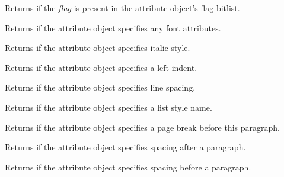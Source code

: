 Returns \true if the {\it flag} is present in the attribute object's flag bitlist.

\label{wxrichtextattrhasfont}


Returns \true if the attribute object specifies any font attributes.

\label{wxrichtextattrhasitalic}


Returns \true if the attribute object specifies italic style.

\label{wxrichtextattrhasleftindent}


Returns \true if the attribute object specifies a left indent.

\label{wxrichtextattrhaslinespacing}


Returns \true if the attribute object specifies line spacing.

\label{wxrichtextattrhasliststylename}


Returns \true if the attribute object specifies a list style name.

\label{wxrichtextattrhaspagebreak}


Returns \true if the attribute object specifies a page break before this paragraph.

\label{wxrichtextattrhasparagraphspacingafter}


Returns \true if the attribute object specifies spacing after a paragraph.

\label{wxrichtextattrhasparagraphspacingbefore}


Returns \true if the attribute object specifies spacing before a paragraph.

